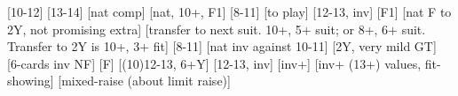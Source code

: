 \begin{bidsemi}
[10-12]
[13-14]
[nat comp]
[nat, 10+, F1]
    [8-11]
        [to play]
    [12-13, inv]
    [F1]
    [nat F to 2Y, not promising extra]
[transfer to next suit. 10+, 5+ suit; or 8+, 6+ suit. Transfer to 2Y is 10+, 3+ fit]
    [8-11]
        [nat inv against 10-11]
        [2Y, very mild GT]
        [6-cards inv NF]
        [F]
    [(10)12-13, 6+Y]
    [12-13, inv]
    [inv+]
[inv+ (13+) values, fit-showing]
[mixed-raise (about limit raise)]
\end{bidsemi}